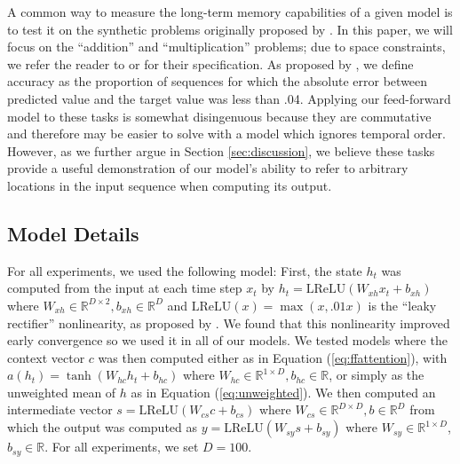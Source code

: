 \documentclass{article} %
\begin{document}
A common way to measure the long-term memory capabilities of a given model is to test it on the synthetic problems originally proposed by \cite{hochreiter1997long}.
In this paper, we will focus on the ``addition'' and ``multiplication'' problems; due to space constraints, we refer the reader to \citep{hochreiter1997long} or \citep{sutskever2013importance} for their specification.
As proposed by \cite{hochreiter1997long}, we define accuracy as the proportion of sequences for which the absolute error between predicted value and the target value was less than .04.
Applying our feed-forward model to these tasks is somewhat disingenuous because they are commutative and therefore may be easier to solve with a model which ignores temporal order.
However, as we further argue in Section \ref{sec:discussion}, we believe these tasks provide a useful demonstration of our model's ability to refer to arbitrary locations in the input sequence when computing its output.

\subsection{Model Details}

For all experiments, we used the following model:
First, the state $h_t$ was computed from the input at each time step $x_t$ by $h_t = \textrm{LReLU}(W_{xh}x_t + b_{xh})$ where $W_{xh} \in \mathbb{R}^{D \times 2}, b_{xh} \in \mathbb{R}^D$ and $\textrm{LReLU}(x) = \max(x, .01x)$ is the ``leaky rectifier'' nonlinearity, as proposed by \cite{maas2013rectifier}.
We found that this nonlinearity improved early convergence so we used it in all of our models.
We tested models where the context vector $c$ was then computed either as in Equation (\ref{eq:ffattention}), with $a(h_t) =\tanh(W_{hc}h_t + b_{hc})$
where $W_{hc} \in \mathbb{R}^{1 \times D}, b_{hc} \in \mathbb{R}$, or simply as the unweighted mean of $h$ as in Equation (\ref{eq:unweighted}).
We then computed an intermediate vector $s = \textrm{LReLU}(W_{cs}c + b_{cs})$ where $W_{cs} \in \mathbb{R}^{D \times D}, b \in \mathbb{R}^D$ from which the output was computed as $y = \textrm{LReLU}(W_{sy}s + b_{sy})$ where $W_{sy} \in \mathbb{R}^{1 \times D}$, $b_{sy} \in \mathbb{R}$.
For all experiments, we set $D = 100$.
\end{document}
